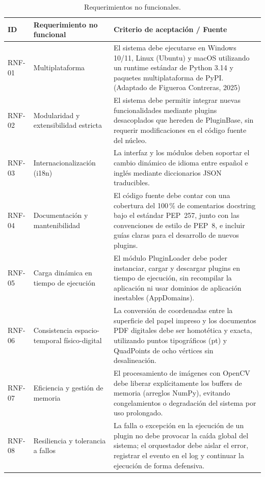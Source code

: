 \begin{table}[H]
    \centering
    \caption{Requerimientos no funcionales.}
    \label{tab:rnf}
    \begin{small}
    \begin{tabular}{L{1.2cm} L{3.0cm} L{9.5cm}}
        \toprule
        ID & Requerimiento no funcional & Criterio de aceptación / Fuente \\ \midrule
        RNF-01 & Multiplataforma & El sistema debe ejecutarse en Windows 10/11, Linux (Ubuntu) y macOS utilizando un runtime estándar de Python 3.14 y paquetes multiplataforma de PyPI. (Adaptado de Figueroa Contreras, 2025) \\ \midrule
        RNF-02 & Modularidad y extensibilidad estricta & El sistema debe permitir integrar nuevas funcionalidades mediante plugins desacoplados que hereden de  PluginBase, sin requerir modificaciones en el código fuente del núcleo. \\ \midrule
        RNF-03 & Internacionalización (i18n) & La interfaz y los módulos deben soportar el cambio dinámico de idioma entre español e inglés mediante diccionarios JSON traducibles. \\ \midrule
        RNF-04 & Documentación y mantenibilidad & El código fuente debe contar con una cobertura del 100\,\% de comentarios docstring bajo el estándar PEP~257, junto con las convenciones de estilo de PEP~8, e incluir guías claras para el desarrollo de nuevos plugins. \\ \midrule
        RNF-05 & Carga dinámica en tiempo de ejecución & El módulo PluginLoader debe poder instanciar, cargar y descargar plugins en tiempo de ejecución, sin recompilar la aplicación ni usar dominios de aplicación inestables (AppDomains). \\ \midrule
        RNF-06 & Consistencia espacio-temporal físico-digital & La conversión de coordenadas entre la superficie del papel impreso y los documentos PDF digitales debe ser homotética y exacta, utilizando puntos tipográficos (pt) y QuadPoints de ocho vértices sin desalineación. \\ \midrule
        RNF-07 & Eficiencia y gestión de memoria & El procesamiento de imágenes con OpenCV debe liberar explícitamente los buffers de memoria (arreglos NumPy), evitando congelamientos o degradación del sistema por uso prolongado. \\ \midrule
        RNF-08 & Resiliencia y tolerancia a fallos & La falla o excepción en la ejecución de un plugin no debe provocar la caída global del sistema; el orquestador debe aislar el error, registrar el evento en el log y continuar la ejecución de forma defensiva. \\ \bottomrule
    \end{tabular}
    \end{small}
\end{table}
 
